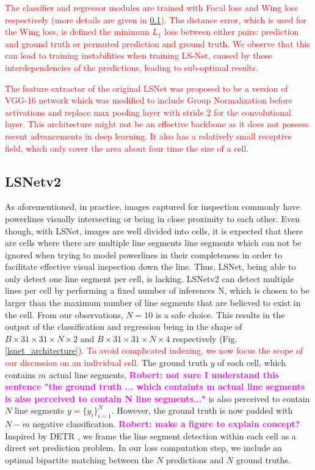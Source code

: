 \documentclass[journal]{IEEEtran}
\newcommand{\commentR}[1]{\textbf{\textcolor{magenta}{Robert: #1}}}
\newcommand{\textK}[1]{\textcolor{red}{#1}}
\begin{document}
\textK{The classifier and regressor modules are trained with Focal loss \cite{focal_loss} and Wing loss \cite{wing_loss} respectively (more details are given in \ref{lsnetv2_subsection}). The distance error, which is used for the Wing loss, is defined the minimum $L_1$ loss between either pairs: prediction and ground truth or permuted prediction and ground truth. We observe that this can lead to training instabilities when training LS-Net, caused by these interdependencies of the predictions, leading to sub-optimal results.}

\textK{The feature extractor of the original LSNet was proposed to be a version of VGG-16 network \cite{vgg} which was modified to include Group Normalization \cite{group_norm} before activations and replace max pooling layer with stride 2 for the convolutional layer. This architecture might not be an effective backbone as it does not possess recent advancements in deep learning. It also has a relatively small receptive field, which only cover the area about four time the size of a cell.}




\subsection{LSNetv2}\label{lsnetv2_subsection}
As aforementioned, in practice, images captured for inspection commonly have powerlines visually intersecting or being in close proximity to each other. Even though, with LSNet, images are well divided into cells, it is expected that there are cells where there are multiple line segments line segments which can not be ignored when trying to model powerlines in their completeness in order to facilitate effective visual inspection down the line. Thus, LSNet, being able to only detect one line segment per cell, is lacking. LSNetv2 can detect multiple lines per cell by performing a fixed number of inferences N, which is chosen to be larger than the maximum number of line segments that are believed to exist in the cell. From our observations, $N=10$ is a safe choice. This results in the output of the classification and regression being in the shape of $B \times 31 \times 31 \times N \times 2$ and $B \times 31 \times 31 \times N \times 4$ respectively (Fig. \ref{lsnet_architecture}). \textcolor{red}{To avoid complicated indexing, we now focus the scope of our discussion on an individual cell.} The ground truth $y$ of each cell, which contains $m$ actual line segments, \commentR{not sure I understand this sentence "the ground truth ... which containts m actual line segments is also perceived to contain N line segments..."} is also perceived to contain $N$ line segments $y=\{y_i\}^N_{i=1}$. However, the ground truth is now padded with $N-m$ negative classification. \commentR{make a figure to explain concept?} Inspired by DETR \cite{DETR}, we frame the line segment detection within each cell as a direct set prediction problem. In our loss computation step, we include an optimal bipartite matching between the $N$ predictions and $N$ ground truths.
\end{document}
